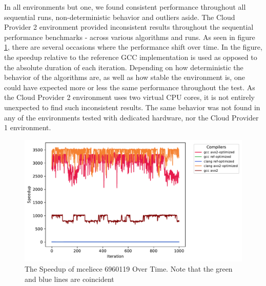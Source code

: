 

In all environments but one, we found consistent performance throughout all sequential runs, non-deterministic behavior and outliers aside. The Cloud Provider 2 environment provided inconsistent results throughout the sequential performance benchmarks - across various algorithms and runs. As seen in figure \ref{figure:results:sequential:mceliece-decrpyt-cloud-provider-2}, there are several occasions where the performance shift over time. In the figure, the speedup relative to the reference GCC implementation is used as opposed to the absolute duration of each iteration. Depending on how deterministic the behavior of the algorithms are, as well as how stable the environment is, one could have expected more or less the same performance throughout the test. As the Cloud Provider 2 environment uses two virtual CPU cores, it is not entirely unexpected to find such inconsistent results. The same behavior was not found in any of the environments tested with dedicated hardware, nor the Cloud Provider 1 environment.

\begin{figure}
    \centering
    \includegraphics[scale=0.75]{chapters/results/sequential/mceliece_6960119_decrypt_Cloud Provider 2.pdf}
    \caption{The Speedup of \gls{mceliece} 6960119 Over Time. Note that the green and blue lines are coincident}
    \label{figure:results:sequential:mceliece-decrpyt-cloud-provider-2}
\end{figure}

